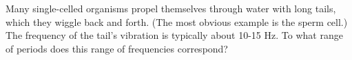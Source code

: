 Many single-celled organisms propel themselves through
water with long tails, which they wiggle back and forth.
(The most obvious example is the sperm cell.) The frequency
of the tail's vibration is typically about 10-15 Hz. To what
range of periods does this range of frequencies correspond?\answercheck
